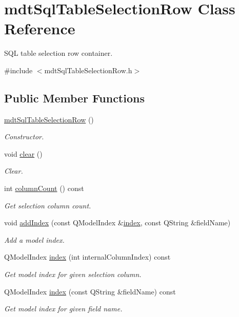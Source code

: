 \hypertarget{classmdt_sql_table_selection_row}{\section{mdt\-Sql\-Table\-Selection\-Row Class Reference}
\label{classmdt_sql_table_selection_row}
}


S\-Q\-L table selection row container.  




{\ttfamily \#include $<$mdt\-Sql\-Table\-Selection\-Row.\-h$>$}

\subsection*{Public Member Functions}
\begin{DoxyCompactItemize}
\item 
\hyperlink{classmdt_sql_table_selection_row_a6195a8daa2fc45a039818a8c657debec}{mdt\-Sql\-Table\-Selection\-Row} ()
\begin{DoxyCompactList}\small\item\em Constructor. \end{DoxyCompactList}\item 
void \hyperlink{classmdt_sql_table_selection_row_a59a353e24957d5b1b72c31f08613171e}{clear} ()
\begin{DoxyCompactList}\small\item\em Clear. \end{DoxyCompactList}\item 
int \hyperlink{classmdt_sql_table_selection_row_a7c0a686867a9161bdeba4631871221b8}{column\-Count} () const 
\begin{DoxyCompactList}\small\item\em Get selection column count. \end{DoxyCompactList}\item 
void \hyperlink{classmdt_sql_table_selection_row_a6efff251e9434e726243aa5b493c1b2e}{add\-Index} (const Q\-Model\-Index \&\hyperlink{classmdt_sql_table_selection_row_a2531414ca23913415c9dc4889627c6d8}{index}, const Q\-String \&field\-Name)
\begin{DoxyCompactList}\small\item\em Add a model index. \end{DoxyCompactList}\item 
Q\-Model\-Index \hyperlink{classmdt_sql_table_selection_row_a2531414ca23913415c9dc4889627c6d8}{index} (int internal\-Column\-Index) const 
\begin{DoxyCompactList}\small\item\em Get model index for given selection column. \end{DoxyCompactList}\item 
Q\-Model\-Index \hyperlink{classmdt_sql_table_selection_row_aae6f64cb81d6a91714023c191405b856}{index} (const Q\-String \&field\-Name) const 
\begin{DoxyCompactList}\small\item\em Get model index for given field name. \end{DoxyCompactList}\end{DoxyCompactItemize}


